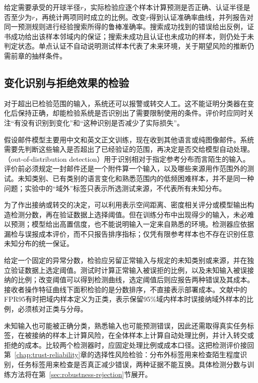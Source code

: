 给定需要承受的开球半径$r$，实际检验应逐个样本计算预测是否正确、认证半径是否至少为$r$，再统计两项同时成立的比例。改变$r$得到认证准确率曲线，并列报告对同一预测规则进行经验搜索所得的鲁棒准确率。搜索成功找到的错误给出反例，证书成功给出该样本邻域内的保证；搜索未成功且认证也未成功的样本，则仍处于未判定状态。单点认证不自动说明测试样本代表了未来环境，关于期望风险的推断仍需前章的抽样条件。

\subsection{变化识别与拒绝效果的检验}
\label{sec:robustness-monitor-test}

对于超出已检验范围的输入，系统还可以报警或转交人工。这不能证明分类器在变化后保持正确，却能检验系统是否识别出了需要限制使用的条件。评价时应同时关注“有没有识别到变化”和“这种识别是否减少了实际损失”。

假设邮件模型主要用中文和英文正文训练，现在收到其他语言或纯图像邮件。系统需要先判断这些输入是否超出了已经验证的范围，再决定是否交给模型自动处理。（out-of-distribution detection）用于识别相对于指定参考分布而言陌生的输入。评价前必须规定一封邮件还是一个附件算一个输入，以及哪些来源用作范围外的测试。未知类别、已有类别的语言变化和熟悉范围内的低频困难样本，并不是同一种问题；实验中的“域外”标签只表示所选测试来源，不代表所有未知分布。

为了作出接纳或转交的决定，可以利用表示空间距离、密度相关评分或模型输出构造检测分数，再在验证数据上选择阈值。但在训练分布中出现得少的输入，未必难以预测；模型给出高置信度，也不能说明输入一定来自熟悉的环境。检测器应依据漏检与误报成本评价，而不只报告排序指标；仅凭有限参考样本也不存在识别任意未知分布的统一保证。

给定一个固定的异常分数，检验应另留正常输入与规定的未知类别或来源，并在独立验证数据上选定阈值。测试时计算正常输入被误拒的比例，以及未知输入被误接纳的比例；改变阈值可以得到检测曲线，选定阈值后则应报告两种错误及其成本。接收者操作特征曲线下面积检验的是分数排序，不直接表示部署成本。文献中的FPR95有时把域内样本定义为正类，表示保留95\%域内样本时误接纳域外样本的比例，必须核对正类与分母。

未知输入也可能被正确分类，熟悉输入也可能预测错误，因此还需取得真实任务标签，在被接纳的样本上计算风险，在全体样本上计算自动处理比例，并计入转交或拒绝的成本。比较两个检测器时，应固定处理比例或成本口径。这把检测评价接回第~\ref{chap:trust-reliability}章的选择性风险检验：分布外标签用来检查陌生程度识别，任务标签用来检查是否真正减少错误，两种证据不能互换。具体检测分数与训练方法将在第~\ref{sec:robustness-rejection}节展开。

